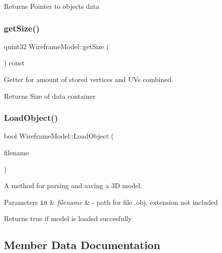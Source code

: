 \begin{DoxyReturn}{Returns}
Pointer to object\textquotesingle{}s data 
\end{DoxyReturn}
\mbox{\label{class_wireframe_model_a5fc0323e4618b80e1b2b227f2470b6a0}} 
\subsubsection{get\+Size()}
{\footnotesize\ttfamily quint32 Wireframe\+Model\+::get\+Size (\begin{DoxyParamCaption}{ }\end{DoxyParamCaption}) const}



Getter for amount of stored vertices and UV\textquotesingle{}s combined. 

\begin{DoxyReturn}{Returns}
Size of data container 
\end{DoxyReturn}
\mbox{\label{class_wireframe_model_ac5f8817ea433184dda70ee25633043ae}} 
\subsubsection{Load\+Object()}
{\footnotesize\ttfamily bool Wireframe\+Model\+::\+Load\+Object (\begin{DoxyParamCaption}\item[{const Q\+String}]{filename }\end{DoxyParamCaption})}



A method for parsing and saving a 3D model. 


\begin{DoxyParams}[1]{Parameters}
\mbox{\tt in}  & {\em filename} & -\/ path for file .obj, extension not included \\
\hline
\end{DoxyParams}
\begin{DoxyReturn}{Returns}
true if model is loaded succesfully 
\end{DoxyReturn}


\subsection{Member Data Documentation}
\mbox{\label{class_wireframe_model_a9fb28b2dedbdcfff31c9ccc592b8492a}} 
